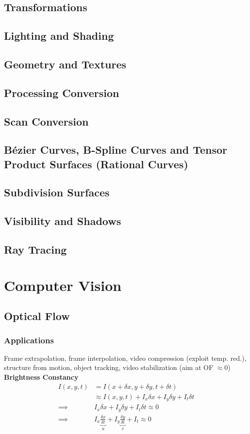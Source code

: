 \documentclass[a4paper,10pt]{article}
\begin{document}
\subsection{Transformations}
\subsection{Lighting and Shading}
\subsection{Geometry and Textures}
\subsection{Processing Conversion}
\subsection{Scan Conversion}
\subsection{Bézier Curves, B-Spline Curves and Tensor Product Surfaces (Rational Curves)}
\subsection{Subdivision Surfaces}
\subsection{Visibility and Shadows}
\subsection{Ray Tracing}


\pagebreak
\section{Computer Vision}
\subsection{Optical Flow}
\subsubsection{Applications} Frame extrapolation, frame interpolation, video compression (exploit temp. red.), structure from motion, object tracking, video stabilization (aim at OF \( \approx 0 \))
\textbf{Brightness Constancy}
\begin{align*}
    I(x,y,t) &= I(x+ \delta x, y + \delta y, t + \delta t) \\
	     &\approx I(x,y,t) + I_x \delta x + I_y \delta y + I_t \delta t \tag{Taylor approx., good if small motion}\\
    \implies &I_x \delta x + I_y \delta y + I_t \delta t \approx 0 \\
    \implies &I_x \underbrace{\frac{\delta x}{\delta t}}_u + I_y \underbrace{\frac{\delta y}{\delta t}}_v + I_t \approx 0
\end{align*}
\end{document}
